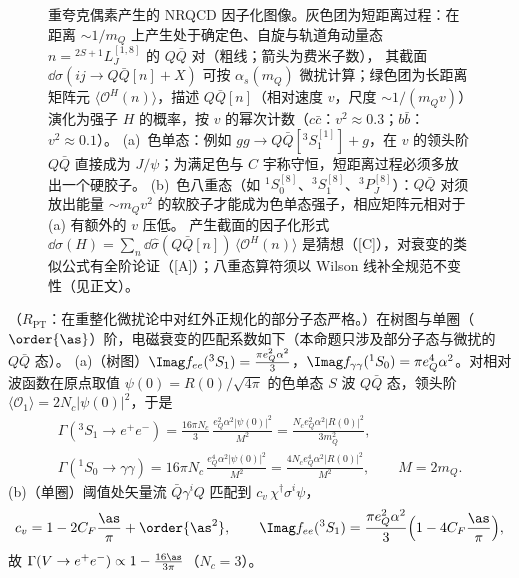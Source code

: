 \begin{figure}[htbp]
\caption{重夸克偶素产生的 NRQCD 因子化图像。灰色团为短距离过程：在距离 $\sim1/m_Q$ 上产生处于确定色、自旋与轨道角动量态 $n={}^{2S+1}L_J^{[1,8]}$ 的 $Q\bar Q$ 对（粗线；箭头为费米子数），
其截面 $\dd\hat\sigma(ij\to Q\bar Q[n]+X)$ 可按 $\alpha_s(m_Q)$ 微扰计算；绿色团为长距离矩阵元 $\langle\mathcal O^{H}(n)\rangle$，描述 $Q\bar Q[n]$（相对速度 $v$，尺度 $\sim1/(m_Qv)$）演化为强子 $H$ 的概率，按 $v$ 的幂次计数（$c\bar c$：$v^2\approx0.3$；$b\bar b$：$v^2\approx0.1$）。
(a)~色单态：例如 $gg\to Q\bar Q[{}^3S_1^{[1]}]+g$，在 $v$ 的领头阶 $Q\bar Q$ 直接成为 $J/\psi$；为满足色与 $C$ 宇称守恒，短距离过程必须多放出一个硬胶子。
(b)~色八重态（如 ${}^1S_0^{[8]}$、${}^3S_1^{[8]}$、${}^3P_J^{[8]}$）：$Q\bar Q$ 对须放出能量 $\sim m_Qv^2$ 的软胶子才能成为色单态强子，相应矩阵元相对于 (a) 有额外的 $v$ 压低。
产生截面的因子化形式 $\dd\sigma(H)=\sum_n\dd\hat\sigma(Q\bar Q[n])\,\langle\mathcal O^H(n)\rangle$ 是猜想（[C]），对衰变的类似公式有全阶论证（[A]）；八重态算符须以 Wilson 线补全规范不变性（见正文）。}
\label{fig:nrqcd}
\end{figure}
\begin{proposition}\label{prop:heavy-nrqcd-matching}
（$R_{\mathrm{PT}}$：在重整化微扰论中对红外正规化的部分子态严格。）在树图与单圈（$\order{\as}$）阶，电磁衰变的匹配系数如下（本命题只涉及部分子态与微扰的 $Q\bar Q$ 态）。
(a)（树图）$\Imag f_{ee}({}^3S_1)=\frac{\pi e_Q^2\alpha^2}{3}$，$\Imag f_{\gamma\gamma}({}^1S_0)=\pi e_Q^4\alpha^2$。对相对波函数在原点取值 $\psi(0)=R(0)/\sqrt{4\pi}$ 的色单态 $S$ 波 $Q\bar Q$ 态，领头阶 $\langle\mathcal O_1\rangle=2N_c|\psi(0)|^2$，于是
\begin{equation}\label{eq:heavy-EMwidths}
\begin{gathered}
\Gamma({}^3S_1\to e^+e^-)=\frac{16\pi N_c}{3}\,\frac{e_Q^2\alpha^2|\psi(0)|^2}{M^2}=\frac{N_ce_Q^2\alpha^2|R(0)|^2}{3m_Q^2},\\
\Gamma({}^1S_0\to\gamma\gamma)=16\pi N_c\,\frac{e_Q^4\alpha^2|\psi(0)|^2}{M^2}=\frac{4N_ce_Q^4\alpha^2|R(0)|^2}{M^2},\qquad M=2m_Q .
\end{gathered}
\end{equation}
(b)（单圈）阈值处矢量流 $\bar Q\gamma^iQ$ 匹配到 $c_v\,\chi^\dagger\sigma^i\psi$，
\begin{equation}\label{eq:heavy-cv}
c_v=1-2C_F\frac{\as}{\pi}+\order{\as^2},\qquad
\Imag f_{ee}({}^3S_1)=\frac{\pi e_Q^2\alpha^2}{3}\Big(1-4C_F\frac{\as}{\pi}\Big),
\end{equation}
故 $\Gamma(V\to e^+e^-)\propto1-\frac{16\as}{3\pi}$（$N_c=3$）。
\end{proposition}

